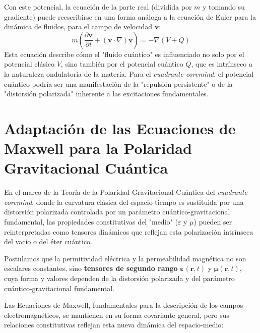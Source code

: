 \documentclass{book}
\begin{document}
Con este potencial, la ecuación de la parte real (dividida por $m$ y tomando su gradiente) puede reescribirse en una forma análoga a la ecuación de Euler para la dinámica de fluidos, para el campo de velocidad $\mathbf{v}$:
\begin{equation}
    m \left( \frac{\partial \mathbf{v}}{\partial t} + (\mathbf{v} \cdot \nabla) \mathbf{v} \right) = -\nabla (V + Q)
    \label{eq:euler_quantum}
\end{equation}
Esta ecuación describe cómo el "fluido cuántico" es influenciado no solo por el potencial clásico $V$, sino también por el potencial cuántico $Q$, que es intrínseco a la naturaleza ondulatoria de la materia. Para el \textit{cuadrante-coremind}, el potencial cuántico podría ser una manifestación de la "repulsión persistente" o de la "distorsión polarizada" inherente a las excitaciones fundamentales.

\section*{Adaptación de las Ecuaciones de Maxwell para la Polaridad Gravitacional Cuántica}
\label{sec:maxwell_adapted}

En el marco de la Teoría de la Polaridad Gravitacional Cuántica del \textit{cuadrante-coremind}, donde la curvatura clásica del espacio-tiempo es sustituida por una distorsión polarizada controlada por un parámetro cuántico-gravitacional fundamental, las propiedades constitutivas del "medio" ($\varepsilon$ y $\mu$) pueden ser reinterpretadas como tensores dinámicos que reflejan esta polarización intrínseca del vacío o del éter cuántico.

Postulamos que la permitividad eléctrica y la permeabilidad magnética no son escalares constantes, sino \textbf{tensores de segundo rango} $\boldsymbol{\varepsilon}(\mathbf{r}, t)$ y $\boldsymbol{\mu}(\mathbf{r}, t)$, cuya forma y valores dependen de la distorsión polarizada y del parámetro cuántico-gravitacional fundamental.

Las Ecuaciones de Maxwell, fundamentales para la descripción de los campos electromagnéticos, se mantienen en su forma covariante general, pero sus relaciones constitutivas reflejan esta nueva dinámica del espacio-medio:
\end{document}
